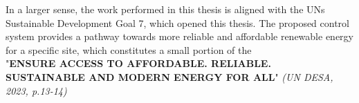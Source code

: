 In a larger sense, the work performed in this thesis is aligned with the UNs Sustainable Development Goal 7\cite{un_sdg_7}, which opened this thesis. The proposed control system provides a pathway towards more reliable and affordable renewable energy for a specific site, which constitutes a small portion of the \\
\newline
\newline
\newline
"\textbf{ENSURE ACCESS TO AFFORDABLE. RELIABLE.
SUSTAINABLE AND MODERN ENERGY FOR ALL}" \textit{(UN DESA, 2023, p.13-14)}\cite{Desa2023-mr} 